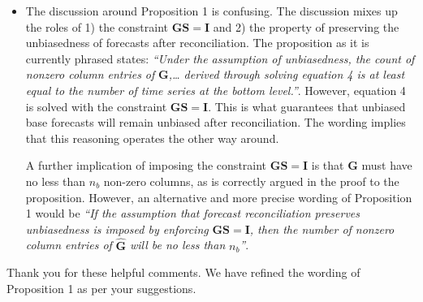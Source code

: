 \documentclass[11pt,a4paper,]{article}
\renewenvironment{quote}
               {\list{}{\rightmargin\leftmargin}%
                \item\relax\color[RGB]{0,150,0}}
               {\endlist}
\begin{document}
\begin{itemize}
\item
  The discussion around Proposition 1 is confusing. The discussion mixes
  up the roles of 1) the constraint \(\bm{GS}=\bm{I}\) and 2) the
  property of preserving the unbiasedness of forecasts after
  reconciliation. The proposition as it is currently phrased states:
  \emph{``Under the assumption of unbiasedness, the count of nonzero
  column entries of} \(\bm{G}\)\emph{,\ldots{} derived through solving
  equation 4 is at least equal to the number of time series at the
  bottom level.''}. However, equation 4 is solved with the constraint
  \(\bm{GS}=\bm{I}\). This is what guarantees that unbiased base
  forecasts will remain unbiased after reconciliation. The wording
  implies that this reasoning operates the other way around.

  A further implication of imposing the constraint \(\bm{GS}=\bm{I}\) is
  that \(\bm{G}\) must have no less than \(n_b\) non-zero columns, as is
  correctly argued in the proof to the proposition. However, an
  alternative and more precise wording of Proposition 1 would be
  \emph{``If the assumption that forecast reconciliation preserves
  unbiasedness is imposed by enforcing} \(\bm{GS}=\bm{I}\)\emph{, then
  the number of nonzero column entries of} \(\hat{\bm{G}}\) \emph{will
  be no less than} \(n_b\)\emph{''}.
\end{itemize}

\begin{quote}
Thank you for these helpful comments. We have refined the wording of
Proposition 1 as per your suggestions.
\end{quote}
\end{document}
